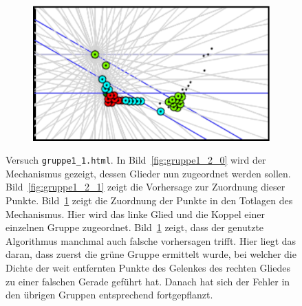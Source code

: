 \begin{figure}
\begin{subfigure}[t]{0.24\textwidth}
        \caption{}
        \label{fig:gruppe1_2_2}
    \end{subfigure}
    \begin{subfigure}[t]{0.24\textwidth}
        \includegraphics[width=\textwidth]{gfx/gruppe1_2_3.png}
        \caption{}
        \label{fig:gruppe1_2_3}
    \end{subfigure}
    \caption[Versuch \lstinline{gruppe1_1.html}]{Versuch \lstinline{gruppe1_1.html}. In Bild~\ref{fig:gruppe1_2_0} wird der Mechanismus gezeigt, dessen Glieder nun zugeordnet werden sollen.
    Bild~\ref{fig:gruppe1_2_1} zeigt die Vorhersage zur Zuordnung dieser Punkte.
    Bild~\ref{fig:gruppe1_2_2} zeigt die Zuordnung der Punkte in den Totlagen des Mechanismus. Hier wird das linke Glied und die Koppel einer einzelnen Gruppe zugeordnet. Bild~\ref{fig:gruppe1_2_2} zeigt, dass der genutzte Algorithmus manchmal auch falsche vorhersagen trifft. Hier liegt das daran, dass zuerst die grüne Gruppe ermittelt wurde, bei welcher die Dichte der weit entfernten Punkte des Gelenkes des rechten Gliedes zu einer falschen Gerade geführt hat. Danach hat sich der Fehler in den übrigen Gruppen entsprechend fortgepflanzt.}
    \label{fig:gruppe1_2}
\end{figure}

